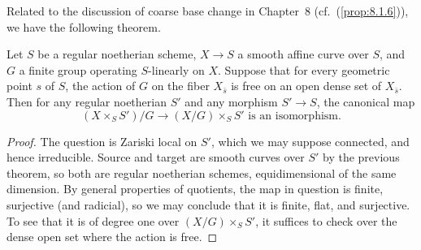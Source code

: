 Related to the discussion of coarse base change in Chapter~8 (cf.~(\ref{prop:8.1.6})), we have the following theorem.

\begin{theorem*}
Let $S$ be a regular noetherian scheme, $X \to S$ a smooth affine curve over $S$, and $G$ a finite group operating $S$-linearly on $X$. Suppose that for every geometric point $s$ of $S$, the action of $G$ on the fiber $X_{\bar{s}}$ is free on an open dense set of $X_{\bar{s}}$. Then for any regular noetherian $S'$ and any morphism $S' \to S$, the canonical map
\[
(X \times_S S')/G \to (X/G) \times_S S' \text{ is an isomorphism.}
\]
\end{theorem*}

\begin{proof}
The question is Zariski local on $S'$, which we may suppose connected, and hence irreducible. Source and target are smooth curves over $S'$ by the previous theorem, so both are regular noetherian schemes, equidimensional of the same dimension. By general properties of quotients, the map in question is finite, surjective (and radicial), so we may conclude that it is finite, flat, and surjective. To see that it is of degree one over $(X/G) \times_S S'$, it suffices to check over the dense open set where the action is free.
\end{proof}
